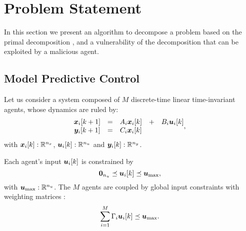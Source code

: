 \documentclass{ifacconf}  %
\begin{document}
\section{Problem Statement}\label{sec:PS}
In this section we present an algorithm to decompose a \mpc{} problem based on the primal decomposition \citep{BoydEtAl2015}, and a vulnerability of the decomposition that can be exploited by a malicious agent.

\subsection{Model Predictive Control}\label{ssec:MPC}
Let us consider a system composed of $M$ discrete-time linear time-invariant agents, whose dynamics are ruled by:
\begin{equation}
\begin{matrix}
  \label{eq:systems}
\vec{x}_{i}[k+1]&=&A_{i}\xik &+& B_{i}\uik\\
\vec{y}_{i}[k+1]&=&C_{i}\xik &&
\end{matrix},
\end{equation}
with $\boldsymbol{x}_{i}[k]:\mathbb{R}^{n_{x}}$, $\boldsymbol{u}_{i}[k]:\mathbb{R}^{n_{u}}$ and $\boldsymbol{y}_{i}[k]:\mathbb{R}^{n_{y}}$.

Each agent's input $\uik$ is constrained by
\begin{equation}
  \label{eq:u_local_constraints}
  \0_{n_{u}}\preceq\uik\preceq\vec{u}_{\max},
\end{equation}
with ${\boldsymbol{u}_{\mathrm{\max}}:\mathbb{R}^{n_{u}}}$.
The $M$ agents are coupled by global input constraints with weighting matrices :
\begin{equation}
  \label{eq:global_constraint}
  \sum^{\nsubsystems}_{i=1}\Gamma_{i}\uik\preceq\umax.
\end{equation}
\end{document}
